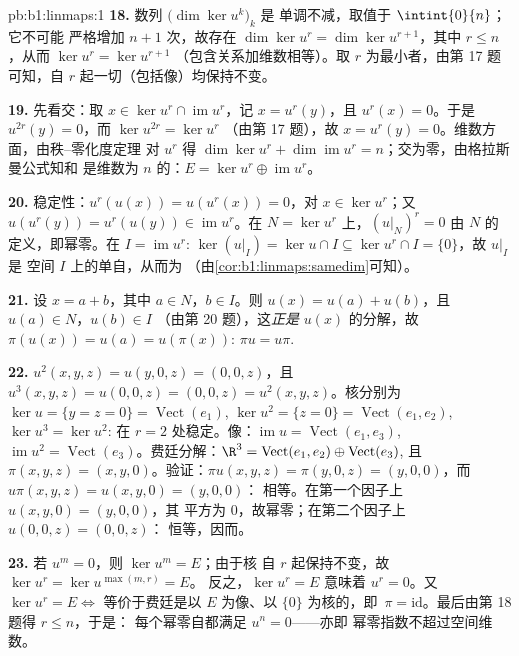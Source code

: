 \begin{solution}{pb:b1:linmaps:1}
\textbf{18.} 数列 $\bigl(\dim\ker u^k\bigr)_k$ 是
单调不减，取值于 $\intint{0}{n}$；它不可能
严格增加 $n + 1$ 次，故存在 $\dim\ker u^{r} = \dim\ker
u^{r+1}$，其中 $r \leq n$，从而 $\ker u^{r} = \ker u^{r+1}$
（包含关系加维数相等）。取 $r$ 为最小者，由第 17 题
可知，自 $r$ 起一切（包括像）均保持不变。

\textbf{19.} 先看交：取 $x \in \ker u^{r} \cap
\operatorname{im} u^{r}$，记 $x = u^{r}(y)$，且 $u^{r}(x) =
0$。于是 $u^{2r}(y) = 0$，而 $\ker u^{2r} = \ker u^{r}$
（由第 17 题），故 $x = u^{r}(y) = 0$。维数方面，由秩--零化度定理
对 $u^{r}$ 得 $\dim\ker u^{r} + \dim\operatorname{im} u^{r}
= n$；交为零，由格拉斯曼公式知和
是维数为 $n$ 的：$E = \ker u^{r} \oplus
\operatorname{im} u^{r}$。

\textbf{20.} 稳定性：$u^{r}(u(x)) = u(u^{r}(x)) = 0$，对 $x
\in \ker u^{r}$；又 $u(u^{r}(y)) = u^{r}(u(y)) \in
\operatorname{im} u^{r}$。在 $N = \ker u^{r}$ 上，$(u|_N)^{r} = 0$
由 $N$ 的定义，即幂零。在 $I = \operatorname{im}
u^{r}$: $\ker(u|_I) = \ker u \cap I \subseteq \ker u^{r} \cap I
= \{0\}$，故 $u|_I$ 是
空间 $I$ 上的单自，从而为
（由\cref{cor:b1:linmaps:samedim}可知）。

\textbf{21.} 设 $x = a + b$，其中 $a \in N$，$b \in I$。则
$u(x) = u(a) + u(b)$，且 $u(a) \in N$，$u(b) \in I$
（由第 20 题），这\emph{正是} $u(x)$ 的分解，故
$\pi(u(x)) = u(a) = u(\pi(x))$: $\pi u = u\pi$.

\textbf{22.} $u^2(x,y,z) = u(y, 0, z) = (0, 0, z)$，且
$u^3(x,y,z) = u(0,0,z) = (0,0,z) = u^2(x,y,z)$。核分别为 $\ker u
= \{y = z = 0\} = \operatorname{Vect}(e_1)$, $\ker u^2 = \{z =
0\} = \operatorname{Vect}(e_1, e_2)$, $\ker u^3 = \ker u^2$:
在 $r = 2$ 处稳定。像：$\operatorname{im} u =
\operatorname{Vect}(e_1, e_3)$, $\operatorname{im} u^2 =
\operatorname{Vect}(e_3)$。费廷分解：$\R^3 =
\operatorname{Vect}(e_1, e_2) \oplus \operatorname{Vect}(e_3)$,
且 $\pi(x, y, z) = (x, y, 0)$。验证：$\pi u(x,y,z) = \pi(y, 0,
z) = (y, 0, 0)$，而 $u\pi(x,y,z) = u(x, y, 0) = (y, 0, 0)$：
相等。在第一个因子上 $u(x, y, 0) = (y, 0, 0)$，其
平方为 $0$，故幂零；在第二个因子上 $u(0,0,z) = (0,0,z)$：
恒等，因而。

\textbf{23.} 若 $u^m = 0$，则 $\ker u^m = E$；由于核
自 $r$ 起保持不变，故 $\ker u^{r} = \ker u^{\max(m, r)} = E$。
反之，$\ker u^{r} = E$ 意味着 $u^{r} = 0$。又 $\ker u^{r} =
E \iff$ 等价于费廷是以 $E$ 为像、以 $\{0\}$ 为核的，即\
$\pi = \mathrm{id}$。最后由第 18 题得 $r \leq n$，于是：
每个幂零自都满足 $u^{n} = 0$——亦即
幂零指数不超过空间维数。


\end{solution}

